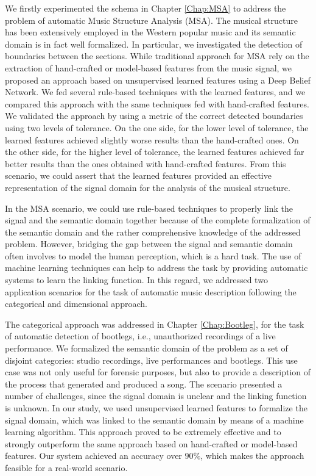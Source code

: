 We firstly experimented the schema in Chapter \ref{Chap:MSA} to address the problem of automatic Music Structure Analysis (MSA). The musical structure has been extensively employed in the Western popular music and its semantic domain is in fact well formalized. In particular, we investigated the detection of boundaries between the sections. While traditional approach for MSA rely on the extraction of hand-crafted or model-based features from the music signal, we proposed an approach based on unsupervised learned features using a Deep Belief Network. We fed several rule-based techniques with the learned features, and we compared this approach with the same techniques fed with hand-crafted features. We validated the approach by using a metric of the correct detected boundaries using two levels of tolerance. On the one side, for the lower level of tolerance, the learned features achieved slightly worse results than the hand-crafted ones. On the other side, for the higher level of tolerance, the learned features achieved far better results than the ones obtained with hand-crafted features. From this scenario, we could assert that the learned features provided an effective representation of the signal domain for the analysis of the musical structure. 

In the MSA scenario, we could use rule-based techniques to properly link the signal and the semantic domain together because of the complete formalization of the semantic domain and the rather comprehensive knowledge of the addressed problem. However, bridging the gap between the signal and semantic domain often involves to model the human perception, which is a hard task. The use of machine learning techniques can help to address the task by providing automatic systems to learn the linking function. In this regard, we addressed two application scenarios for the task of automatic music description following the categorical and dimensional approach.

The categorical approach was addressed in Chapter \ref{Chap:Bootleg}, for the task of automatic detection of bootlegs, i.e., unauthorized recordings of a live performance. We formalized the semantic domain of the problem as a set of disjoint categories: studio recordings, live performances and bootlegs. This use case was not only useful for forensic purposes, but also to provide a description of the process that generated and produced a song. The scenario presented a number of challenges, since the signal domain is unclear and the linking function is unknown. In our study, we used unsupervised learned features to formalize the signal domain, which was linked to the semantic domain by means of a machine learning algorithm. This approach proved to be extremely effective and to strongly outperform the same approach based on hand-crafted or model-based features. Our system achieved an accuracy over $90\%$, which makes the approach feasible for a real-world scenario.

